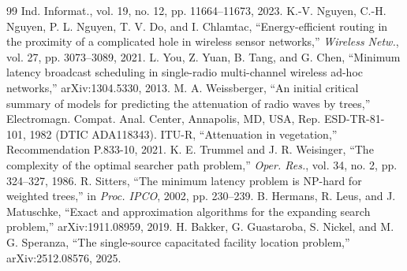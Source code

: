 \begin{thebibliography}{99}
{Ind. Informat.}, vol. 19, no. 12, pp. 11664--11673, 2023.
 K.-V. Nguyen, C.-H. Nguyen, P. L. Nguyen, T. V. Do, and I. Chlamtac, ``Energy-efficient routing
in the proximity of a complicated hole in wireless sensor networks,'' \emph{Wireless Netw.}, vol. 27, pp. 3073--3089,
2021.
 L. You, Z. Yuan, B. Tang, and G. Chen, ``Minimum latency broadcast scheduling in single-radio
multi-channel wireless ad-hoc networks,'' arXiv:1304.5330, 2013.
 M. A. Weissberger, ``An initial critical summary of models for predicting the attenuation of
radio waves by trees,'' Electromagn. Compat. Anal. Center, Annapolis, MD, USA, Rep. ESD-TR-81-101, 1982 (DTIC
ADA118343). 
 ITU-R, ``Attenuation in vegetation,'' Recommendation P.833-10, 2021.
 K. E. Trummel and J. R. Weisinger, ``The complexity of the optimal searcher path problem,''
\emph{Oper. Res.}, vol. 34, no. 2, pp. 324--327, 1986.
 R. Sitters, ``The minimum latency problem is NP-hard for weighted trees,'' in \emph{Proc. IPCO},
2002, pp. 230--239.
 B. Hermans, R. Leus, and J. Matuschke, ``Exact and approximation algorithms for the expanding
search problem,'' arXiv:1911.08959, 2019.
 H. Bakker, G. Guastaroba, S. Nickel, and M. G. Speranza, ``The single-source capacitated facility
location problem,'' arXiv:2512.08576, 2025. 
\end{thebibliography}
